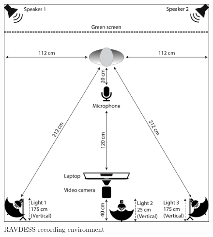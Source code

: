 \begin{figure}
    \centering
    \includegraphics[scale = 0.4]{images/RAVDESS_studioSetup.png}
    \caption{RAVDESS recording environment \cite{ravdess_journal}}
    \label{ravdessstudio}
\end{figure}

